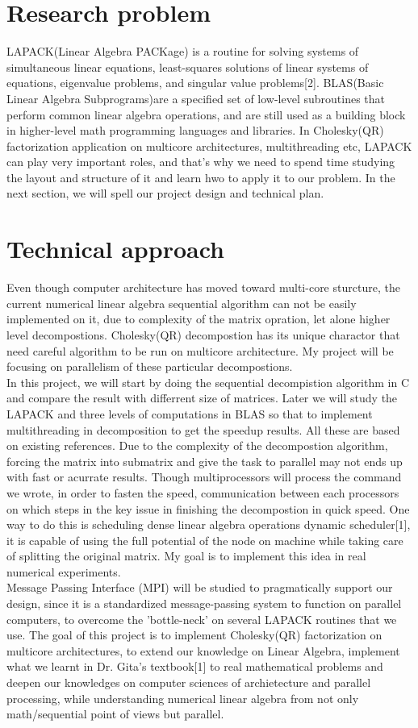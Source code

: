 \documentclass{article}
\begin{document}
\section{ Research problem}
LAPACK(Linear Algebra PACKage) is a routine for solving systems of simultaneous linear equations, least-squares solutions of linear systems of equations, eigenvalue problems, and singular value problems[2]. BLAS(Basic Linear Algebra Subprograms)are a specified set of low-level subroutines that perform common linear algebra operations, and are still used as a building block in higher-level math programming languages and libraries. In Cholesky(QR)
factorization application on multicore architectures, multithreading etc, LAPACK can play very important roles, and that's why we need to spend time studying the layout and structure of it and learn hwo to apply it to our problem. In the next section,
we will spell our  project design and  technical plan.
\section{Technical approach}
Even though computer architecture has moved toward multi-core sturcture, the current numerical linear algebra sequential algorithm can not be easily implemented on it, due to complexity of the matrix opration, let alone higher level decompostions. Cholesky(QR) decompostion has its unique charactor that need careful algorithm to be run on  multicore architecture. My project will be focusing on parallelism of these particular decompostions. \\
In this project, we will start by doing the sequential decompistion algorithm in C and compare the result with differrent size of matrices. Later we will study the LAPACK and three levels of computations in BLAS so that to implement multithreading in decomposition to get the speedup results.  All these are based on existing references.  Due to the complexity of the decompostion algorithm, forcing the matrix into submatrix and give the task to parallel may not ends up with fast or acurrate results. Though multiprocessors will process the command we wrote, in order to fasten the speed, communication between each processors on which steps in the key issue in finishing the decompostion in quick speed. One way to do this is  scheduling
dense linear algebra operations dynamic scheduler[1], it is capable of using
the full potential of the node on machine while taking care of splitting the original matrix. My goal is to implement this idea in real numerical experiments. \\
Message Passing Interface (MPI) will be studied to pragmatically support our design, since  it is a standardized  message-passing system  to function on parallel computers, to overcome the 'bottle-neck' on several LAPACK routines that we use. The goal of this project is to implement Cholesky(QR) factorization on multicore architectures, to extend our knowledge on Linear Algebra, implement what we learnt in Dr. Gita's textbook[1] to real mathematical problems and deepen our knowledges on computer sciences of archietecture and parallel processing, while understanding numerical linear algebra from not only math/sequential point of views but parallel. 
\pagebreak
\end{document}
